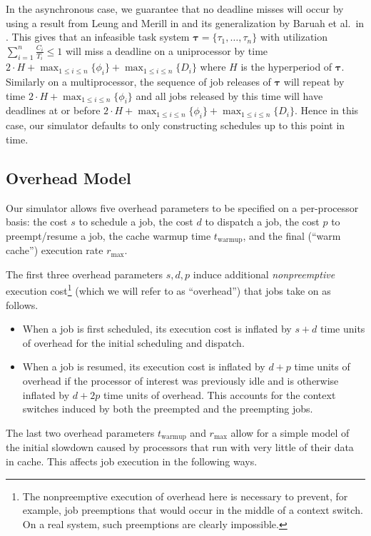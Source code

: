 \documentclass[11pt]{article}
\begin{document}
In the asynchronous case, we guarantee that no deadline misses will occur by using a result from Leung and Merill in \cite{Leung} and its generalization by Baruah et al.\ in \cite{Baruah}. This gives that an infeasible task system $\bm{\tau}=\{\tau_1, \dots, \tau_n\}$ with utilization $\sum_{i=1}^n \frac{C_i}{T_i} \leq 1$ will miss a deadline on a uniprocessor by time $2 \cdot H + \max_{1 \leq i \leq n}\{\phi_i\} + \max_{1 \leq i \leq n}\{D_i\}$ where $H$ is the hyperperiod of $\bm{\tau}$. Similarly on a multiprocessor, the sequence of job releases of $\bm{\tau}$ will repeat by time $2 \cdot H + \max_{1 \leq i \leq n}\{\phi_i\}$ and all jobs released by this time will have deadlines at or before $2 \cdot H + \max_{1 \leq i \leq n}\{\phi_i\} + \max_{1 \leq i \leq n}\{D_i\}$. Hence in this case, our simulator defaults to only constructing schedules up to this point in time.

\subsection{Overhead Model}

Our simulator allows five overhead parameters to be specified on a per-processor basis: the cost $s$ to schedule a job, the cost $d$ to dispatch a job, the cost $p$ to preempt/resume a job, the cache warmup time $t_\text{warmup}$, and the final (``warm cache'') execution rate $r_\text{max}$.

The first three overhead parameters $s,d,p$ induce additional \emph{nonpreemptive} execution cost\footnote{The nonpreemptive execution of overhead here is necessary to prevent, for example, job preemptions that would occur in the middle of a context switch. On a real system, such preemptions are clearly impossible.} (which we will refer to as ``overhead'') that jobs take on as follows.

\begin{itemize}\itemsep0em
	\item When a job is first scheduled, its execution cost is inflated by $s+d$ time units of overhead for the initial scheduling and dispatch.
	\item When a job is resumed, its execution cost is inflated by $d+p$ time units of overhead if the processor of interest was previously idle and is otherwise inflated by $d+2p$ time units of overhead. This accounts for the context switches induced by both the preempted and the preempting jobs.
\end{itemize}

The last two overhead parameters $t_\text{warmup}$ and $r_\text{max}$ allow for a simple model of the initial slowdown caused by processors that run with very little of their data in cache. This affects job execution in the following ways.
\end{document}
